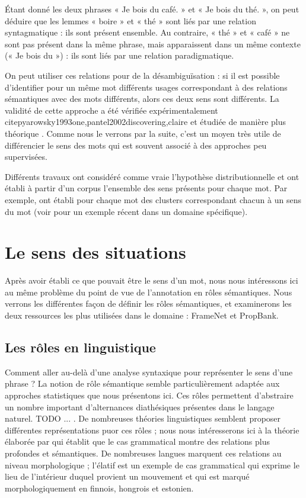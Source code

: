 Étant donné les deux phrases « Je bois du café. » et « Je bois du thé. », on peut déduire que les lemmes « boire » et « thé » sont liés par une relation syntagmatique : ils sont présent ensemble. Au contraire, « thé » et « café » ne sont pas présent dans la même phrase, mais apparaissent dans un même contexte (« Je bois du ») : ils sont liés par une relation paradigmatique.

On peut utiliser ces relations pour de la désambiguïsation : si il est possible d'identifier pour un même mot différents usages correspondant à des relations sémantiques avec des mots différents, alors ces deux sens sont différents. La validité de cette approche a été vérifiée expérimentalement citep{yarowsky1993one,pantel2002discovering,claire} et étudiée de manière plus théorique \citep{sahlgren2006word,sahlgren2008distributional}. Comme nous le verrons par la suite, c'est un moyen très utile de différencier le sens des mots qui est souvent associé à des approches peu supervisées.

Différents travaux ont considéré comme vraie l'hypothèse distributionnelle et ont établi à partir d'un corpus l'ensemble des sens présents pour chaque mot. Par exemple, \cite{schutze1998automatic,pantel2002discovering,niu2007three,pedersen2010duluth} ont établi pour chaque mot des clusters correspondant chacun à un sens du mot (voir \cite{liu2012semantic} pour un exemple récent dans un domaine spécifique).

\section{Le sens des situations}
\label{senssituation}

Après avoir établi ce que pouvait être le sens d'un mot, nous nous intéressons ici au même problème du point de vue de l'annotation en rôles sémantiques. Nous verrons les différentes façon de définir les rôles sémantiques, et examinerons les deux ressources les plus utilisées dans le domaine : FrameNet et PropBank.

\subsection{Les rôles en linguistique}

Comment aller au-delà d'une analyse syntaxique pour représenter le sens d'une phrase ? La notion de rôle sémantique semble particulièrement adaptée aux approches statistiques que nous présentons ici. Ces rôles permettent d'abstraire un nombre important d'alternances diathésiques présentes dans le langage naturel. TODO ... . De nombreuses théories linguistiques semblent proposer différentes représentations puor ces rôles ; nous nous intéresserons ici à la théorie élaborée par \cite{fillmore1968case} qui établit que le cas grammatical montre des relations plus profondes et sémantiques. De nombreuses langues marquent ces relations au niveau morphologique ; l'élatif est un exemple de cas grammatical qui exprime le lieu de l'intérieur duquel provient un mouvement et qui est marqué morphologiquement en finnois, hongrois et estonien.

